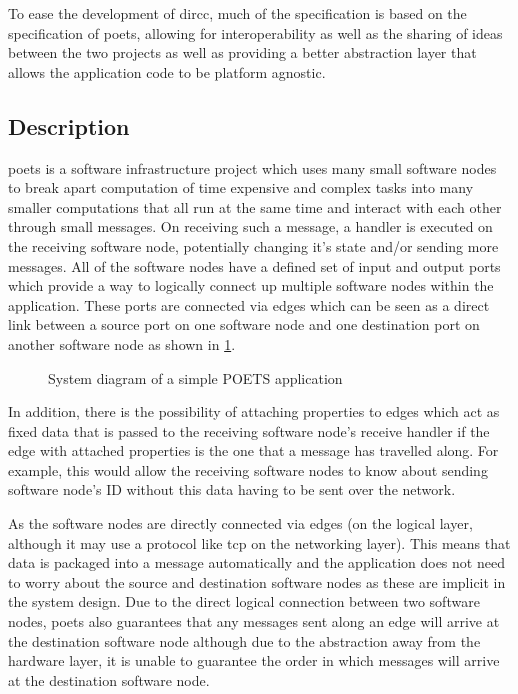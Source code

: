 \documentclass[paper=a4, fontsize=11pt, bibliography=totocnumbered]{scrartcl}
\numberwithin{equation}{section}		%
\numberwithin{figure}{section}			%
\numberwithin{table}{section}				%
\begin{document}
To ease the development of \gls{dircc}, much of the specification is based on the specification of \gls{poets}, allowing for interoperability as well as the sharing of ideas between the two projects as well as providing a better abstraction layer that allows the \gls{application} code to be platform agnostic.

\subsection{ Description}

\gls{poets} is a software infrastructure project which uses many small \glspl{software node} to break apart computation of time expensive and complex tasks into many smaller computations that all run at the same time and interact with each other through small \glspl{message}. On receiving such a \gls{message}, a handler is executed on the receiving \gls{software node}, potentially changing it's state and/or sending more \glspl{message}. All of the \glspl{software node} have a defined set of input and output \glspl{port} which provide a way to logically connect up multiple \glspl{software node} within the \gls{application}. These \glspl{port} are connected via \glspl{edge} which can be seen as a direct link between a \gls{source port} on one \gls{software node} and one \gls{destination port} on another \gls{software node} as shown in \cref{fig:poets_system}.

\begin{figure}
\caption{System diagram of a simple POETS application}
\label{fig:poets_system}
\end{figure}

In addition, there is the possibility of attaching properties to \glspl{edge} which act as fixed data that is passed to the receiving \gls{software node}'s receive handler if the \gls{edge} with attached properties is the one that a \gls{message} has travelled along. For example, this would allow the receiving \glspl{software node} to know about sending \gls{software node}'s ID without this data having to be sent over the network.

As the \glspl{software node} are directly connected via \glspl{edge} (on the logical layer, although it may use a protocol like \gls{tcp} on the networking layer). This means that data is packaged into a \gls{message} automatically and the application does not need to worry about the source and destination \glspl{software node} as these are implicit in the system design. Due to the direct logical connection between two \glspl{software node}, \gls{poets} also guarantees that any \glspl{message} sent along an \gls{edge} will arrive at the destination \gls{software node} although due to the abstraction away from the hardware layer, it is unable to guarantee the order in which \glspl{message} will arrive at the destination \gls{software node}.
\end{document}
